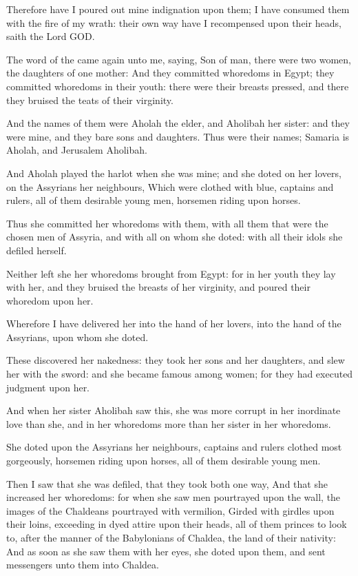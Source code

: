 \Verse Therefore have I poured out mine indignation upon them; I have consumed them with the fire of my wrath: their own way have I recompensed upon their heads, saith the Lord GOD.


\Chapter
\Verse The word of the \LORD came again unto me, saying, \Verse Son of man, there were two women, the daughters of one mother: \Verse And they committed whoredoms in Egypt; they committed whoredoms in their youth: there were their breasts pressed, and there they bruised the teats of their virginity.

\Verse And the names of them were Aholah the elder, and Aholibah her sister: and they were mine, and they bare sons and daughters. Thus were their names; Samaria is Aholah, and Jerusalem Aholibah.

\Verse And Aholah played the harlot when she was mine; and she doted on her lovers, on the Assyrians her neighbours, \Verse Which were clothed with blue, captains and rulers, all of them desirable young men, horsemen riding upon horses.

\Verse Thus she committed her whoredoms with them, with all them that were the chosen men of Assyria, and with all on whom she doted: with all their idols she defiled herself.

\Verse Neither left she her whoredoms brought from Egypt: for in her youth they lay with her, and they bruised the breasts of her virginity, and poured their whoredom upon her.

\Verse Wherefore I have delivered her into the hand of her lovers, into the hand of the Assyrians, upon whom she doted.

\Verse These discovered her nakedness: they took her sons and her daughters, and slew her with the sword: and she became famous among women; for they had executed judgment upon her.

\Verse And when her sister Aholibah saw this, she was more corrupt in her inordinate love than she, and in her whoredoms more than her sister in her whoredoms.

\Verse She doted upon the Assyrians her neighbours, captains and rulers clothed most gorgeously, horsemen riding upon horses, all of them desirable young men.

\Verse Then I saw that she was defiled, that they took both one way, \Verse And that she increased her whoredoms: for when she saw men pourtrayed upon the wall, the images of the Chaldeans pourtrayed with vermilion, \Verse Girded with girdles upon their loins, exceeding in dyed attire upon their heads, all of them princes to look to, after the manner of the Babylonians of Chaldea, the land of their nativity: \Verse And as soon as she saw them with her eyes, she doted upon them, and sent messengers unto them into Chaldea.

